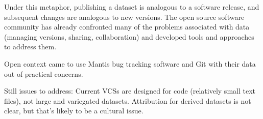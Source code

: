 \documentclass[10pt,a4paper,twocolumn]{article}
\begin{document}
Under this metaphor, publishing a dataset is analogous to a software release, and subsequent changes are analogous to new versions.
The open source software community has already confronted many of the problems associated with data (managing versions, sharing, collaboration) and developed tools and approaches to address them.

\cite{ram_git_2013}
\cite{chen_close_2014}
Open context came to use Mantis bug tracking software and Git with their data out of practical concerns.

Still issues to address: Current VCSs are designed for code (relatively small text files), not large and variegated datasets. 
Attribution for derived datasets is not clear, but that's likely to be a cultural issue.


\nocite{*}
{\small
}

\listoftodos






\end{document}
